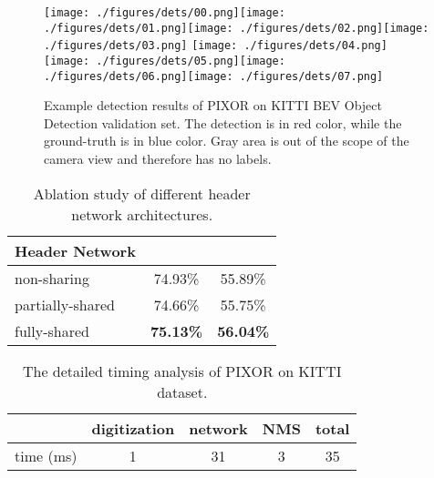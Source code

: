 \begin{figure*}[t]
\begin{center}
   \texttt{[image: ./figures/dets/00.png]}\texttt{[image: ./figures/dets/01.png]}\texttt{[image: ./figures/dets/02.png]}\texttt{[image: ./figures/dets/03.png]}
   \texttt{[image: ./figures/dets/04.png]}\texttt{[image: ./figures/dets/05.png]}\texttt{[image: ./figures/dets/06.png]}\texttt{[image: ./figures/dets/07.png]}
\end{center}
\vspace*{-3mm}
   \caption{Example detection results of PIXOR on KITTI BEV Object Detection validation set. The detection is in red color, while the ground-truth is in blue color. Gray area is out of the scope of the camera view and therefore has no labels.}
\label{fig:det_demo}
\vspace{-0.3cm}
\end{figure*}
\begin{table}[t]
\begin{center}
\begin{small}
\begin{tabular}{|l|cc|}
\hline
Header Network &  &  \\
\hline
non-sharing & 74.93\% & 55.89\% \\
partially-shared & 74.66\% & 55.75\% \\
fully-shared & {\bf 75.13\%} & {\bf 56.04\%} \\
\hline
\end{tabular}
\caption{Ablation study of different header network architectures.}
\label{tab:subnet}
\end{small}
\end{center}
\vspace{-0.5cm}
\end{table}
\begin{table}[t]
\begin{center}
\begin{small}
\begin{tabular}{|l|ccc|c|}
\hline
 & digitization & network & NMS & total \\
\hline
time (ms) & 1 & 31 & 3 & 35 \\
\hline
\end{tabular}
\caption{The detailed timing analysis of PIXOR on KITTI dataset.}
\label{tab:object_time}
\end{small}
\end{center}
\vspace{-0.5cm}
\end{table}



